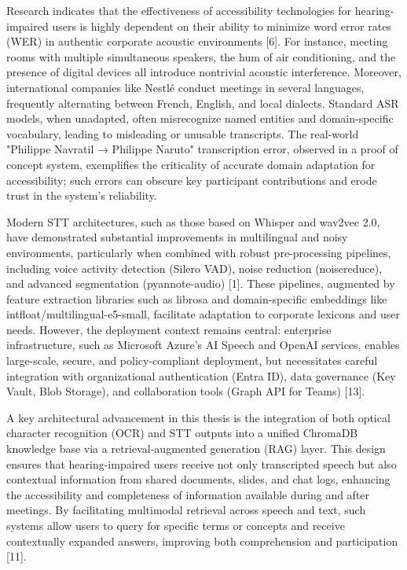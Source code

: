 \documentclass[12pt,a4paper]{article}
\begin{document}
Research indicates that the effectiveness of accessibility technologies for hearing-impaired users is highly dependent on their ability to minimize word error rates (WER) in authentic corporate acoustic environments [6]. For instance, meeting rooms with multiple simultaneous speakers, the hum of air conditioning, and the presence of digital devices all introduce nontrivial acoustic interference. Moreover, international companies like Nestlé conduct meetings in several languages, frequently alternating between French, English, and local dialects. Standard ASR models, when unadapted, often misrecognize named entities and domain-specific vocabulary, leading to misleading or unusable transcripts. The real-world "Philippe Navratil → Philippe Naruto" transcription error, observed in a proof of concept system, exemplifies the criticality of accurate domain adaptation for accessibility; such errors can obscure key participant contributions and erode trust in the system’s reliability.


Modern STT architectures, such as those based on Whisper and wav2vec 2.0, have demonstrated substantial improvements in multilingual and noisy environments, particularly when combined with robust pre-processing pipelines, including voice activity detection (Silero VAD), noise reduction (noisereduce), and advanced segmentation (pyannote-audio) [1]. These pipelines, augmented by feature extraction libraries such as librosa and domain-specific embeddings like intfloat/multilingual-e5-small, facilitate adaptation to corporate lexicons and user needs. However, the deployment context remains central: enterprise infrastructure, such as Microsoft Azure’s AI Speech and OpenAI services, enables large-scale, secure, and policy-compliant deployment, but necessitates careful integration with organizational authentication (Entra ID), data governance (Key Vault, Blob Storage), and collaboration tools (Graph API for Teams) [13].


A key architectural advancement in this thesis is the integration of both optical character recognition (OCR) and STT outputs into a unified ChromaDB knowledge base via a retrieval-augmented generation (RAG) layer. This design ensures that hearing-impaired users receive not only transcripted speech but also contextual information from shared documents, slides, and chat logs, enhancing the accessibility and completeness of information available during and after meetings. By facilitating multimodal retrieval across speech and text, such systems allow users to query for specific terms or concepts and receive contextually expanded answers, improving both comprehension and participation [11].
\end{document}
